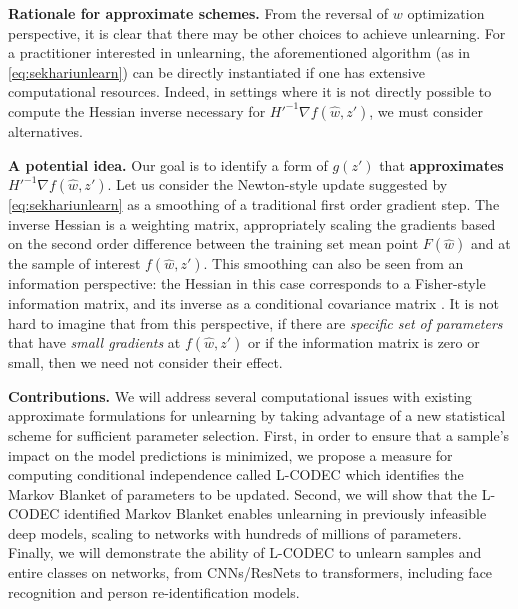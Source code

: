 
\textbf{Rationale for approximate schemes.} From the reversal of $w$ optimization perspective, it is clear that there may be other choices to achieve unlearning.
For a practitioner interested in unlearning, the aforementioned algorithm (as in \eqref{eq:sekhariunlearn}) can be directly instantiated if one has extensive computational resources.
Indeed, in settings where it is not directly possible to compute the Hessian inverse necessary for $H'^{-1} \nabla f(\hat{w},z')$, we must consider alternatives. 

\textbf{A potential idea.} Our goal is to identify a form of $g(z')$ that \textbf{approximates} $H'^{-1} \nabla f(\hat{w},z')$. 
Let us consider the Newton-style update suggested by 
\eqref{eq:sekhariunlearn}
as a smoothing of a traditional first order gradient step. 
The inverse Hessian is a weighting matrix, appropriately scaling the gradients based on the second order difference between the training set mean point $F(\hat{w})$ and at the sample of interest $f(\hat{w},z')$. 
This smoothing can also be seen from an information perspective: the Hessian in this case corresponds to a Fisher-style information matrix, and its inverse as a conditional covariance matrix \citep{Golatkar_2021_CVPR,golatkar2020forgetting}.
It is not hard to imagine that from this perspective, if there are \textit{specific set of parameters} that have \textit{small gradients} at $f(\hat{w},z')$ or if the information matrix is zero or small, then we need not consider their effect. 


\textbf{Contributions.} We will address several computational issues with existing approximate formulations for unlearning by taking advantage of a new statistical scheme for sufficient parameter selection. 
First, in order to ensure that a sample's impact on the model predictions is minimized, we propose a measure for computing conditional independence called L-CODEC which  identifies the Markov Blanket of parameters to be  updated. 
Second, we will show that the L-CODEC identified Markov Blanket enables unlearning in previously infeasible deep models, scaling to networks with hundreds of millions of parameters. 
Finally, we will demonstrate the ability of L-CODEC to unlearn samples and entire classes on networks, from CNNs/ResNets to transformers, including face recognition and person re-identification models.